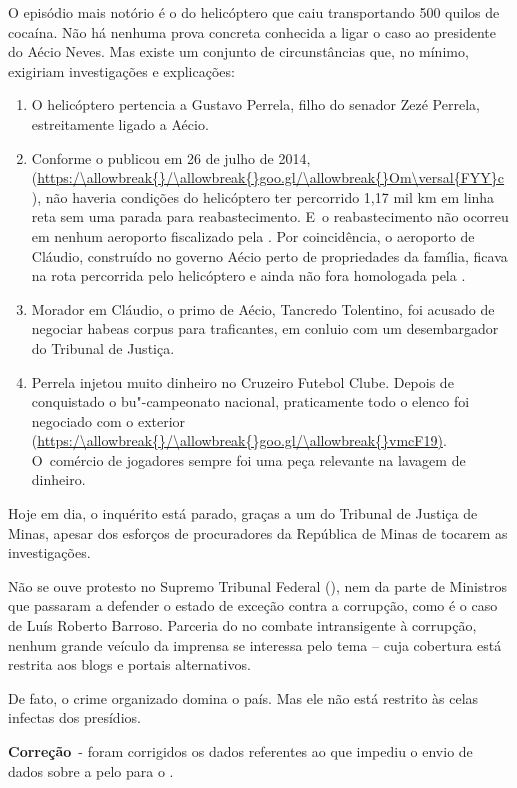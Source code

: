 O episódio mais notório é o do helicóptero que caiu transportando 500
quilos de cocaína. Não há nenhuma prova concreta conhecida a ligar o
caso ao presidente do  Aécio Neves. Mas existe um conjunto de
circunstâncias que, no mínimo, exigiriam investigações e explicações:

\begin{enumerate}
\itemsep1pt\parskip0pt
\item
  O helicóptero pertencia a Gustavo Perrela, filho do senador Zezé
  Perrela, estreitamente ligado a Aécio.
\item
  Conforme o  publicou em 26 de julho de 2014,
  (\url{https:/\allowbreak{}/\allowbreak{}goo.gl/\allowbreak{}Om\versal{FYY}c}~), não haveria condições do helicóptero
  ter percorrido 1,17 mil km em linha reta sem uma parada para
  reabastecimento. E~o reabastecimento não ocorreu em nenhum aeroporto
  fiscalizado pela . Por coincidência, o aeroporto de Cláudio,
  construído no governo Aécio perto de propriedades da família, ficava
  na rota percorrida pelo helicóptero e ainda não fora homologada pela
  .
\item
  Morador em Cláudio, o primo de Aécio, Tancredo Tolentino, foi acusado
  de negociar habeas corpus para traficantes, em conluio com um
  desembargador do Tribunal de Justiça.
\item
  Perrela injetou muito dinheiro no Cruzeiro Futebol Clube. Depois de
  conquistado o bu"-campeonato nacional, praticamente todo o elenco foi
  negociado com o exterior (\url{https:/\allowbreak{}/\allowbreak{}goo.gl/\allowbreak{}vmcF19)}. O~comércio de
  jogadores sempre foi uma peça relevante na lavagem de dinheiro.
\end{enumerate}

Hoje em dia, o inquérito está parado, graças a um  do Tribunal de
Justiça de Minas, apesar dos esforços de procuradores da República de
Minas de tocarem as investigações.

Não se ouve protesto no Supremo Tribunal Federal (), nem da parte de
Ministros que passaram a defender o estado de exceção contra a
corrupção, como é o caso de Luís Roberto Barroso. Parceria do  no
combate intransigente à corrupção, nenhum grande veículo da imprensa se
interessa pelo tema -- cuja cobertura está restrita aos blogs e portais
alternativos.

De fato, o crime organizado domina o país. Mas ele não está restrito às
celas infectas dos presídios.

\textbf{Correção}~- foram corrigidos os dados referentes ao  que
impediu o envio de dados sobre a  pelo  para o .
